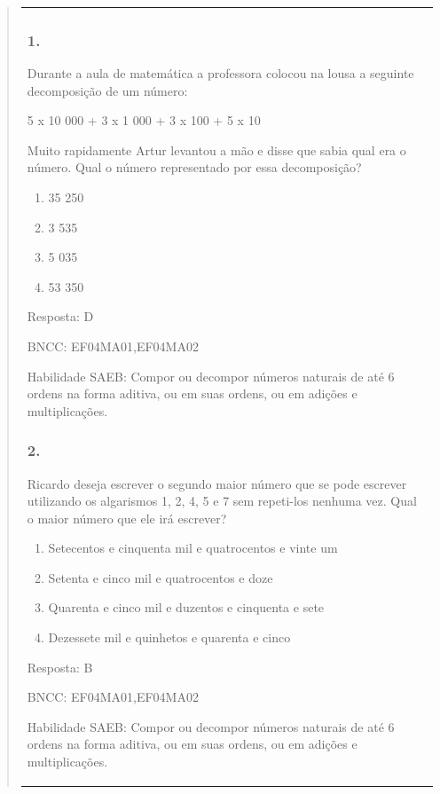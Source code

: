 \begin{enumerate}
\begin{escolha}
\begin{enumerate}
\begin{itemize}
\begin{itemize}
\begin{escolha}
\begin{quote}
\begin{escolha}
{\begin{longtable}[]{@{}l@{}}
\begin{itemize}
\subsubsection{1.}\label{section-172}

Durante a aula de matemática a professora colocou na lousa a seguinte
decomposição de um número:

5 x 10 000 + 3 x 1 000 + 3 x 100 + 5 x 10

Muito rapidamente Artur levantou a mão e disse que sabia qual era o
número. Qual o número representado por essa decomposição?

\begin{enumerate}
\def\labelenumi{\alph{enumi})}
\item
  35 250
\item
  3 535
\item
  5 035
\item
  53 350
\end{enumerate}

Resposta: D

BNCC: EF04MA01,EF04MA02

Habilidade SAEB: Compor ou decompor números naturais de até 6 ordens na
forma aditiva, ou em suas ordens, ou em adições e multiplicações.

\subsubsection{2.}\label{section-173}

Ricardo deseja escrever o segundo maior número que se pode escrever
utilizando os algarismos 1, 2, 4, 5 e 7 sem repeti-los nenhuma vez. Qual
o maior número que ele irá escrever?

\begin{enumerate}
\def\labelenumi{\alph{enumi})}
\item
  Setecentos e cinquenta mil e quatrocentos e vinte um
\item
  Setenta e cinco mil e quatrocentos e doze
\item
  Quarenta e cinco mil e duzentos e cinquenta e sete
\item
  Dezessete mil e quinhetos e quarenta e cinco
\end{enumerate}

Resposta: B

BNCC: EF04MA01,EF04MA02

Habilidade SAEB: Compor ou decompor números naturais de até 6 ordens na
forma aditiva, ou em suas ordens, ou em adições e multiplicações.


\end{itemize}
\end{longtable}}
\end{escolha}
\end{quote}
\end{escolha}
\end{itemize}
\end{itemize}
\end{enumerate}
\end{escolha}
\end{enumerate}

